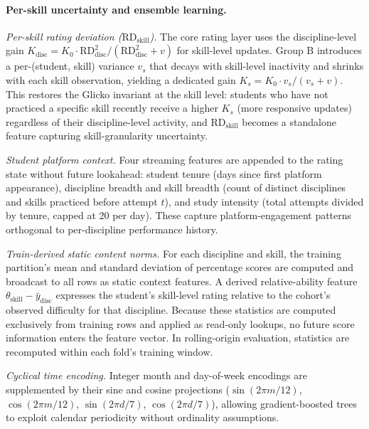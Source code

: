 \documentclass[11pt]{article}
\begin{document}
\paragraph{Per-skill uncertainty and ensemble learning.}
\label{sec:skilluncertainty}

\textit{Per-skill rating deviation ($\mathrm{RD}_{\text{skill}}$).}\quad
The core rating layer uses the discipline-level gain
$K_{\text{disc}} = K_0 \cdot \mathrm{RD}_{\text{disc}}^2 / (\mathrm{RD}_{\text{disc}}^2 + v)$
for skill-level updates.
Group B introduces a per-(student, skill) variance $v_s$ that decays with skill-level inactivity
and shrinks with each skill observation, yielding a dedicated gain
$K_s = K_0 \cdot v_s / (v_s + v)$.
This restores the Glicko invariant at the skill level: students who have not practiced a
specific skill recently receive a higher $K_s$ (more responsive updates) regardless of their
discipline-level activity, and $\mathrm{RD}_{\text{skill}}$ becomes a standalone feature
capturing skill-granularity uncertainty.

\textit{Student platform context.}\quad
Four streaming features are appended to the rating state without future lookahead:
student tenure (days since first platform appearance), discipline breadth and skill breadth
(count of distinct disciplines and skills practiced before attempt $t$), and study intensity
(total attempts divided by tenure, capped at 20 per day).
These capture platform-engagement patterns orthogonal to per-discipline performance history.

\textit{Train-derived static content norms.}\quad
For each discipline and skill, the training partition's mean and standard deviation of
percentage scores are computed and broadcast to all rows as static context features.
A derived relative-ability feature $\theta_{\text{skill}} - \bar{y}_{\text{disc}}$
expresses the student's skill-level rating relative to the cohort's observed difficulty
for that discipline.
Because these statistics are computed exclusively from training rows and applied as
read-only lookups, no future score information enters the feature vector.
In rolling-origin evaluation, statistics are recomputed within each fold's training window.

\textit{Cyclical time encoding.}\quad
Integer month and day-of-week encodings are supplemented by their sine and cosine
projections ($\sin(2\pi m/12)$, $\cos(2\pi m/12)$, $\sin(2\pi d/7)$, $\cos(2\pi d/7)$),
allowing gradient-boosted trees to exploit calendar periodicity without ordinality assumptions.
\end{document}

